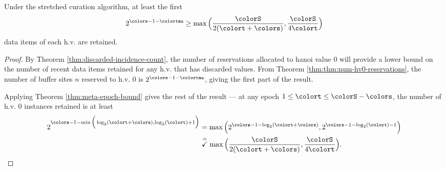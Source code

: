 \begin{lemma}
\label{thm:stretched-reservation-count}
Under the stretched curation algorithm, at least the first
\begin{align*}
2^{\colors - 1 - \colortau}
\geq
\max\Big(
  \frac{\colorS}{2(\colort + \colors)},
  \frac{\colorS}{4\colort}
\Big)
\end{align*}
data items of each h.v. are retained.
\end{lemma}
\begin{proof}

By Theorem \ref{thm:discarded-incidence-count}, the number of reservations allocated to hanoi value 0 will provide a lower bound on the number of recent data items retained for any h.v. that has discarded values.
From Theorem \ref{thm:thm:num-hv0-reservations}, the number of buffer sites $n$ reserved to h.v. 0 is $2^{\colors-1-\colortau}$, giving the first part of the result.

Applying Theorem \ref{thm:meta-epoch-bound} gives the rest of the result --- at any epoch $1 \leq \colort \leq \colorS - \colors$, the number of h.v. 0 instances retained is at least
\begin{align*}
2^{\colors - 1 - \min\Big(
  \log_2(\colort + \colors),
  \log_2(\colort) + 1
\Big)}
&= \max\Big(
  2^{\colors - 1 - \log_2(\colort + \colors)},
  2^{\colors - 1 - \log_2(\colort) - 1}
\Big)\\
&\stackrel{=}{\checkmark} \max\Big(
  \frac{\colorS}{2(\colort + \colors)},
  \frac{\colorS}{4\colort}
\Big).
\end{align*}

\end{proof}
